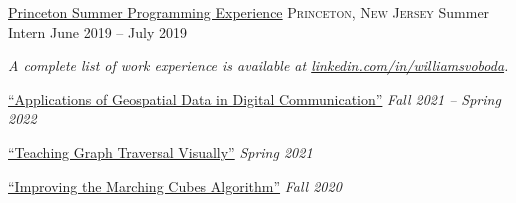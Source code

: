 \documentclass[10pt,letterpaper]{article}
\begin{document}
\headedsection
  {\href{https://www.cs.princeton.edu/academics/ugradpgm/spe/home/}{Princeton Summer Programming Experience}}
  {\textsc{Princeton, New Jersey}} {%
  \headedsubsection
    {Summer Intern}
    {June 2019 -- July 2019}
    {}
}

\vspace{-0.2em}
\begin{center}
  \emph{\small A complete list of work experience is available at \href{https://www.linkedin.com/in/williamsvoboda}{linkedin.com/in/williamsvoboda}.}
\end{center}

\spacedhrule{-0.2em}{-0.4em}


\headedsection
  {\href{https://github.com/thisstillwill/Geo-Thesis}{``Applications of Geospatial Data in Digital Communication''}}
  {\emph{Fall 2021 -- Spring 2022}}
  {}

\headedsection
  {\href{https://thisstillwill.github.io/IW-Spring-2021/}{``Teaching Graph Traversal Visually''}}
  {\emph{Spring 2021}}
  {}

\headedsection
  {\href{https://github.com/thisstillwill/IW-Fall-2020}{``Improving the Marching Cubes Algorithm''}}
  {\emph{Fall 2020}}
  {}
\end{document}

